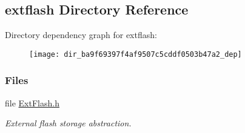 \subsection{extflash Directory Reference}
\label{dir_ba9f69397f4af9507c5cddf0503b47a2}
Directory dependency graph for extflash\+:
\nopagebreak
\begin{figure}[H]
\begin{center}
\leavevmode
\texttt{[image: dir\_ba9f69397f4af9507c5cddf0503b47a2\_dep]}
\end{center}
\end{figure}
\subsubsection*{Files}
\begin{DoxyCompactItemize}
\item 
file \hyperlink{_ext_flash_8h}{Ext\+Flash.\+h}
\begin{DoxyCompactList}\small\item\em External flash storage abstraction. \end{DoxyCompactList}\end{DoxyCompactItemize}
